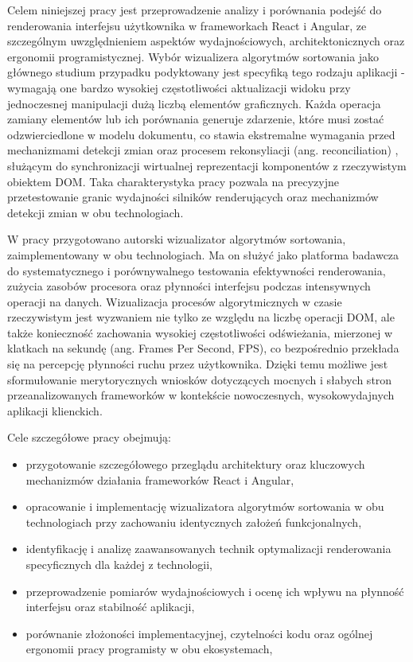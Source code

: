 \documentclass[12pt,openright,twoside]{report}
\begin{document}
Celem niniejszej pracy jest przeprowadzenie analizy i porównania podejść do renderowania interfejsu użytkownika w frameworkach React i Angular, ze szczególnym uwzględnieniem aspektów wydajnościowych, architektonicznych oraz ergonomii programistycznej. Wybór wizualizera algorytmów sortowania jako głównego studium przypadku podyktowany jest specyfiką tego rodzaju aplikacji \cite{Cormen_Intro} - wymagają one bardzo wysokiej częstotliwości aktualizacji widoku przy jednoczesnej manipulacji dużą liczbą elementów graficznych. Każda operacja zamiany elementów lub ich porównania generuje zdarzenie, które musi zostać odzwierciedlone w modelu dokumentu, co stawia ekstremalne wymagania przed mechanizmami detekcji zmian oraz procesem rekonsyliacji (ang. reconciliation) \cite{React_Official}, służącym do synchronizacji wirtualnej reprezentacji komponentów z rzeczywistym obiektem DOM. Taka charakterystyka pracy pozwala na precyzyjne przetestowanie granic wydajności silników renderujących oraz mechanizmów detekcji zmian w obu technologiach.


W pracy przygotowano autorski wizualizator algorytmów sortowania, zaimplementowany w obu technologiach. Ma on służyć jako platforma badawcza do systematycznego i porównywalnego testowania efektywności renderowania, zużycia zasobów procesora oraz płynności interfejsu podczas intensywnych operacji na danych. Wizualizacja procesów algorytmicznych w czasie rzeczywistym jest wyzwaniem nie tylko ze względu na liczbę operacji DOM, ale także konieczność zachowania wysokiej częstotliwości odświeżania, mierzonej w klatkach na sekundę (ang. Frames Per Second, FPS), co bezpośrednio przekłada się na percepcję płynności ruchu przez użytkownika. Dzięki temu możliwe jest sformułowanie merytorycznych wniosków dotyczących mocnych i słabych stron przeanalizowanych frameworków w kontekście nowoczesnych, wysokowydajnych aplikacji klienckich.

Cele szczegółowe pracy obejmują:

\begin{itemize}

\item przygotowanie szczegółowego przeglądu architektury oraz kluczowych mechanizmów działania frameworków React i Angular,

\item opracowanie i implementację wizualizatora algorytmów sortowania w obu technologiach przy zachowaniu identycznych założeń funkcjonalnych,

\item identyfikację i analizę zaawansowanych technik optymalizacji renderowania specyficznych dla każdej z technologii,

\item przeprowadzenie pomiarów wydajnościowych i ocenę ich wpływu na płynność interfejsu oraz stabilność aplikacji,

\item porównanie złożoności implementacyjnej, czytelności kodu oraz ogólnej ergonomii pracy programisty w obu ekosystemach,

\end{itemize}
\end{document}
